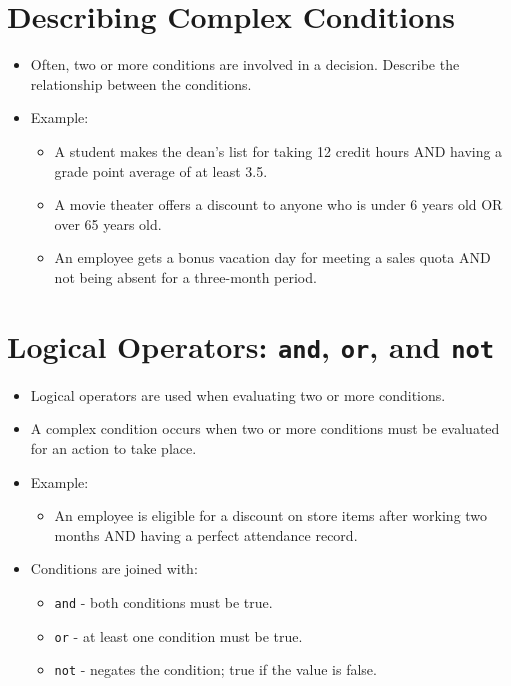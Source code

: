\documentclass{article}
\begin{document}
\section{Describing Complex Conditions}
\begin{itemize}
    \item Often, two or more conditions are involved in a decision. Describe the relationship between the conditions.
    \item Example:
    \begin{itemize}
        \item A student makes the dean's list for taking 12 credit hours AND having a grade point average of at least 3.5.
        \item A movie theater offers a discount to anyone who is under 6 years old OR over 65 years old.
        \item An employee gets a bonus vacation day for meeting a sales quota AND not being absent for a three-month period.
    \end{itemize}
\end{itemize}

\section{Logical Operators: \texttt{and}, \texttt{or}, and \texttt{not}}
\begin{itemize}
    \item Logical operators are used when evaluating two or more conditions.
    \item A complex condition occurs when two or more conditions must be evaluated for an action to take place.
    \item Example:
    \begin{itemize}
        \item An employee is eligible for a discount on store items after working two months AND having a perfect attendance record.
    \end{itemize}
\end{itemize}

\begin{itemize}
    \item Conditions are joined with:
    \begin{itemize}
        \item \texttt{and} - both conditions must be true.
        \item \texttt{or} - at least one condition must be true.
        \item \texttt{not} - negates the condition; true if the value is false.
    \end{itemize}
\end{itemize}
\end{document}
